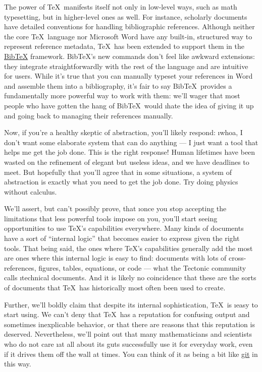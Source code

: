 The power of \TeX\ manifests itself not only in low-level ways, such as math
typesetting, but in higher-level ones as well. For instance, scholarly documents
have detailed conventions for handling bibliographic references. Although
neither the core \TeX\ language nor Microsoft Word have any built-in, structured
way to represent reference metadata, \TeX\ has been extended to support them in
the \href{https://en.wikipedia.org/wiki/BibTeX}{Bib\TeX} framework. Bib\TeX's
new commands don't feel like awkward extensions: they integrate
straightforwardly with the rest of the language and are intuitive for users.
While it's true that you can manually typeset your references in Word and
assemble them into a bibliography, it's fair to say Bib\TeX\ provides a
fundamentally more powerful way to work with them: we’ll wager that most people
who have gotten the hang of Bib\TeX\ would \i{hate} the idea of giving it up and
going back to managing their references manually.

Now, if you’re a healthy skeptic of abstraction, you'll likely respond: \i{whoa,
I don't want some elaborate system that can do anything — I just want a tool
that helps me get the job done}. This is the right response! Human lifetimes
have been wasted on the refinement of elegant but useless ideas, and we have
deadlines to meet. But hopefully that you'll agree that in some situations, a
system of abstraction is exactly what you need to get the job done. Try doing
physics without calculus.

We'll assert, but can't possibly prove, that \i{once you stop accepting the
limitations that less powerful tools impose on you, you'll start seeing
opportunities to use \TeX's capabilities everywhere}. Many kinds of documents
have a sort of “internal logic” that becomes easier to express given the right
tools. That being said, the ones where \TeX's capabilities generally add the
most are ones where this internal logic is easy to find: documents with lots of
cross-references, figures, tables, equations, or code — what the Tectonic
community calls \i{technical documents}. And it is likely no coincidence that
these are the sorts of documents that \TeX\ has historically most often been
used to create.

Further, we’ll boldly claim that despite its internal sophistication, \TeX\ is
\i{easy to start using}. We can't deny that \TeX\ has a reputation for confusing
output and sometimes inexplicable behavior, or that there are reasons that this
reputation is deserved. Nevertheless, we'll point out that many mathematicians
and scientists who do not care \i{at all} about its guts successfully use it for
everyday work, even if it drives them off the wall at times. You can think of it
as being a bit like \href{https://git-scm.com/}{git} in this way.

